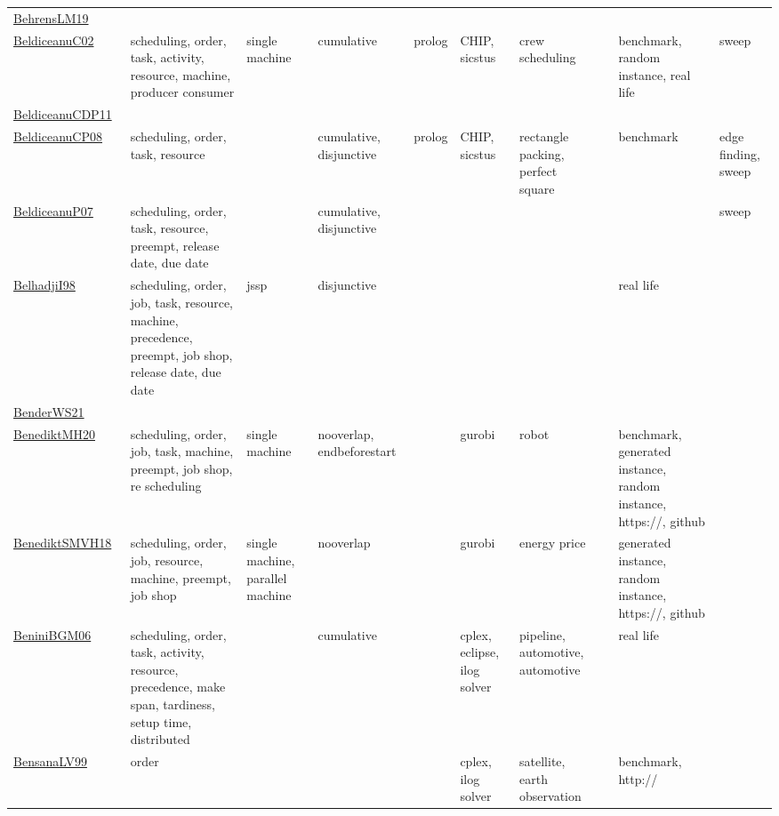 {\begin{longtable}{p{3cm}p{4cm}p{2cm}p{2cm}p{2cm}p{2cm}p{2cm}p{2cm}p{2cm}p{2cm}}
\href{papers/BehrensLM19.pdf}{BehrensLM19}~\cite{BehrensLM19} &  &  &  &  &  &  &  &  & \\
\href{papers/BeldiceanuC02.pdf}{BeldiceanuC02}~\cite{BeldiceanuC02} & scheduling, order, task, activity, resource, machine, producer consumer & single machine & cumulative & prolog & CHIP, sicstus & crew scheduling &  & benchmark, random instance, real life & sweep\\
\href{articles/BeldiceanuCDP11.pdf}{BeldiceanuCDP11}~\cite{BeldiceanuCDP11} &  &  &  &  &  &  &  &  & \\
\href{papers/BeldiceanuCP08.pdf}{BeldiceanuCP08}~\cite{BeldiceanuCP08} & scheduling, order, task, resource &  & cumulative, disjunctive & prolog & CHIP, sicstus & rectangle packing, perfect square &  & benchmark & edge finding, sweep\\
\href{papers/BeldiceanuP07.pdf}{BeldiceanuP07}~\cite{BeldiceanuP07} & scheduling, order, task, resource, preempt, release date, due date &  & cumulative, disjunctive &  &  &  &  &  & sweep\\
\href{articles/BelhadjiI98.pdf}{BelhadjiI98}~\cite{BelhadjiI98} & scheduling, order, job, task, resource, machine, precedence, preempt, job shop, release date, due date & jssp & disjunctive &  &  &  &  & real life & \\
\href{papers/BenderWS21.pdf}{BenderWS21}~\cite{BenderWS21} &  &  &  &  &  &  &  &  & \\
\href{articles/BenediktMH20.pdf}{BenediktMH20}~\cite{BenediktMH20} & scheduling, order, job, task, machine, preempt, job shop, re scheduling & single machine & nooverlap, endbeforestart &  & gurobi & robot &  & benchmark, generated instance, random instance, https://, github & \\
\href{papers/BenediktSMVH18.pdf}{BenediktSMVH18}~\cite{BenediktSMVH18} & scheduling, order, job, resource, machine, preempt, job shop & single machine, parallel machine & nooverlap &  & gurobi & energy price &  & generated instance, random instance, https://, github & \\
\href{papers/BeniniBGM06.pdf}{BeniniBGM06}~\cite{BeniniBGM06} & scheduling, order, task, activity, resource, precedence, make span, tardiness, setup time, distributed &  & cumulative &  & cplex, eclipse, ilog solver & pipeline, automotive, automotive &  & real life & \\
\href{articles/BensanaLV99.pdf}{BensanaLV99}~\cite{BensanaLV99} & order &  &  &  & cplex, ilog solver & satellite, earth observation &  & benchmark, http:// & \\

\end{longtable}}
